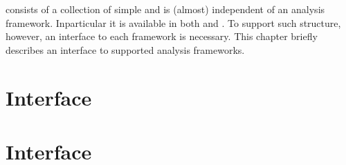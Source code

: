 
{\cmtool} consists of a collection of simple {\CPP} and is (almost) independent of an analysis framework. Inparticular it is available in both {\larlight} and {\larsoft}. To support such structure, however, an interface to each framework is necessary. This chapter briefly describes an interface to supported analysis frameworks.

\section{{\larsoft} Interface}
\label{sec:interface:larsoft}


\section{{\larlight} Interface}
\label{sec:interface:larlight}

